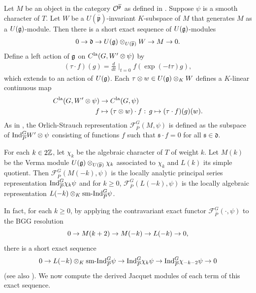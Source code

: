 \documentclass[10pt]{amsart}
\begin{document}
Let $M$ be an object in the category $\mathcal{O}^{\overline{\mathfrak{p}}}$ as defined in \cite{OS_Jordan_Holder}. Suppose $\psi$ is a smooth character of $T$. Let $W$ be a $U(\overline{\mathfrak{p}})$-invariant $K$-subspace of $M$ that generates $M$ as a $U(\mathfrak{g})$-module. Then there is a short exact sequence of $U(\mathfrak{g})$-modules \[
    0 \rightarrow \mathfrak{d} \rightarrow U(\mathfrak{g})\otimes_{U(\overline{\mathfrak{p}})}W \rightarrow M \rightarrow 0.
\] Define a left action of $\mathfrak{g}$ on $C^{\textnormal{la}}(G,W^\prime\otimes\psi)$ by \begin{align*}
    (\tau\cdot f)(g)= \frac{d}{dt} \mid_{t=0}f\left(\exp(-t\tau)g\right),
\end{align*} which extends to an action of $U(\mathfrak{g})$. Each $\tau\otimes w\in U(\mathfrak{g})\otimes_{K}W$ defines a $K$-linear continuous map \begin{align*}
    C^{\textnormal{la}}(G,W^\prime\otimes \psi) & \rightarrow C^{\textnormal{la}}(G,\psi) \\
    f & \mapsto  (\tau\otimes w)\cdot f :\, g\mapsto (\tau\cdot f)(g)(w). 
\end{align*} As in \cite{OS_Jordan_Holder}, the Orlich-Strauch representation $\mathcal{F}_{\overline{P}}^{G}(M,\psi)$ is defined as the subspace of $\textnormal{Ind}_{\overline{P}}^{G}W^\prime \otimes \psi$ consisting of functions $f$ such that $\mathfrak{s}\cdot f=0$ for all $\mathfrak{s}\in \mathfrak{d}$. 

For each $k\in 2\mathbb{Z}$, let $\chi_{k}$ be the algebraic character of $T$ of weight $k$. Let $M(k)$ be the Verma module $U(\mathfrak{g})\otimes_{U(\overline{\mathfrak{p}})}\chi_{k}$ associated to $\chi_{k}$ and $L(k)$ its simple quotient. Then $\mathcal{F}_{\overline{P}}^{G}(M(-k),\psi)$ is the locally analytic principal series representation $\textnormal{Ind}_{\overline{P}}^{G}\chi_{k}\psi$ and for $k\geq 0$, $\mathcal{F}_{\overline{P}}^{G}(L(-k),\psi)$ is the locally algebraic representation $L(-k)\otimes_{K}\textnormal{sm-Ind}_{\overline{P}}^{G}\psi$. 

In fact, for each $k\geq 0$, by applying the contravariant exact functor $\mathcal{F}_{\overline{P}}^{G}(\cdot ,\psi)$ to the BGG resolution \[
    0 \rightarrow M(k+2) \rightarrow M(-k) \rightarrow L(-k) \rightarrow 0,
\] there is a short exact sequence \begin{equation}\label{eq:loc_alg->ind->neg_wt}
    0 \rightarrow L(-k)\otimes_{K}\textnormal{sm-Ind}_{\overline{P}}^{G}\psi \rightarrow \textnormal{Ind}_{\overline{P}}^{G}\chi_{k}\psi \rightarrow \textnormal{Ind}_{\overline{P}}^{G}\chi_{-k-2}\psi \rightarrow 0
\end{equation} (see also \cite{ST_U(g)}). We now compute the derived Jacquet modules of each term of this exact sequence. 
\end{document}
